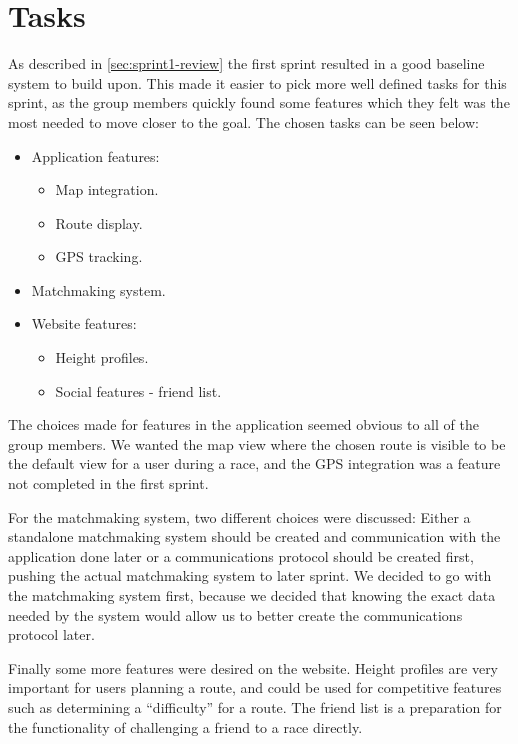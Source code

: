 \section{Tasks}
\label{sec:sprint2-tasks}

As described in \autoref{sec:sprint1-review} the first sprint resulted in a good baseline system to build upon. This made it easier to pick more well defined tasks for this sprint, as the group members quickly found some features which they felt was the most needed to move closer to the goal. The chosen tasks can be seen below:

\begin{itemize}
 \item Application features:
 \begin{itemize}
  \item Map integration.
  \item Route display.
  \item \ac{GPS} tracking.
 \end{itemize}
 \item Matchmaking system.
 \item Website features:
 \begin{itemize}
  \item Height profiles.
  \item Social features - friend list.
 \end{itemize}
\end{itemize}

The choices made for features in the application seemed obvious to all of the group members. We wanted the map view where the chosen route is visible to be the default view for a user during a race, and the \ac{GPS} integration was a feature not completed in the first sprint.

For the matchmaking system, two different choices were discussed: Either a standalone matchmaking system should be created and communication with the application done later or a communications protocol should be created first, pushing the actual matchmaking system to later sprint. We decided to go with the matchmaking system first, because we decided that knowing the exact data needed by the system would allow us to better create the communications protocol later.

Finally some more features were desired on the website. Height profiles are very important for users planning a route, and could be used for competitive features such as determining a ``difficulty'' for a route. The friend list is a preparation for the functionality of challenging a friend to a race directly.
